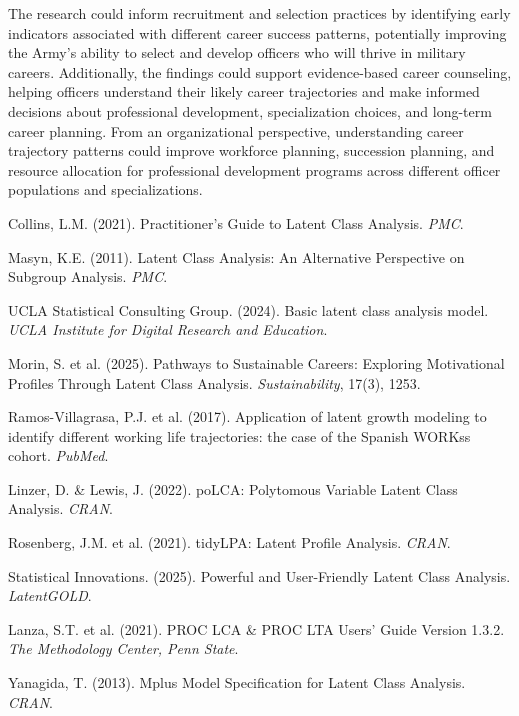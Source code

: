 \documentclass[main.tex]{subfiles}
\begin{document}
The research could inform recruitment and selection practices by identifying early indicators associated with different career success patterns, potentially improving the Army's ability to select and develop officers who will thrive in military careers. Additionally, the findings could support evidence-based career counseling, helping officers understand their likely career trajectories and make informed decisions about professional development, specialization choices, and long-term career planning. From an organizational perspective, understanding career trajectory patterns could improve workforce planning, succession planning, and resource allocation for professional development programs across different officer populations and specializations.

\begin{thebibliography}{20}

Collins, L.M. (2021). Practitioner's Guide to Latent Class Analysis. \textit{PMC}.

Masyn, K.E. (2011). Latent Class Analysis: An Alternative Perspective on Subgroup Analysis. \textit{PMC}.

UCLA Statistical Consulting Group. (2024). Basic latent class analysis model. \textit{UCLA Institute for Digital Research and Education}.

Morin, S. et al. (2025). Pathways to Sustainable Careers: Exploring Motivational Profiles Through Latent Class Analysis. \textit{Sustainability}, 17(3), 1253.

Ramos-Villagrasa, P.J. et al. (2017). Application of latent growth modeling to identify different working life trajectories: the case of the Spanish WORKss cohort. \textit{PubMed}.

Linzer, D. \& Lewis, J. (2022). poLCA: Polytomous Variable Latent Class Analysis. \textit{CRAN}.

Rosenberg, J.M. et al. (2021). tidyLPA: Latent Profile Analysis. \textit{CRAN}.

Statistical Innovations. (2025). Powerful and User-Friendly Latent Class Analysis. \textit{LatentGOLD}.

Lanza, S.T. et al. (2021). PROC LCA \& PROC LTA Users' Guide Version 1.3.2. \textit{The Methodology Center, Penn State}.

Yanagida, T. (2013). Mplus Model Specification for Latent Class Analysis. \textit{CRAN}.


\end{thebibliography}
\end{document}
